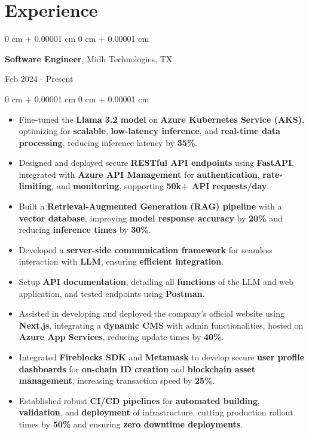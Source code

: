 \documentclass[10pt, letterpaper]{article}
\newenvironment{highlights}{
    \begin{itemize}[
        topsep=0.10 cm,
        parsep=0.10 cm,
        partopsep=0pt,
        itemsep=0pt,
        leftmargin=0 cm + 10pt
    ]
}{
    \end{itemize}
} %
\newenvironment{onecolentry}{
    \begin{adjustwidth}{
        0 cm + 0.00001 cm
    }{
        0 cm + 0.00001 cm
    }
}{
    \end{adjustwidth}
} %
\newenvironment{twocolentry}[2][]{
    \onecolentry
    \def\secondColumn{#2}
    \setcolumnwidth{\fill, 4.5 cm}
    \begin{paracol}{2}
}{
    \switchcolumn \raggedleft \secondColumn
    \end{paracol}
    \endonecolentry
} %
\begin{document}
\section{Experience}

\begin{twocolentry}{
		Feb 2024 - Present
	}
	\textbf{Software Engineer}, Midh Technologies, TX
\end{twocolentry}

\begin{onecolentry}
	\begin{highlights}
		\item Fine-tuned the \textbf{Llama 3.2 model} on \textbf{Azure Kubernetes Service (AKS)}, optimizing for \textbf{scalable}, \textbf{low-latency inference}, and \textbf{real-time data processing}, reducing inference latency by \textbf{35\%}.
		\item Designed and deployed secure \textbf{RESTful API endpoints} using \textbf{FastAPI}, integrated with \textbf{Azure API Management} for \textbf{authentication}, \textbf{rate-limiting}, and \textbf{monitoring}, supporting \textbf{50k+ API requests/day}.
		\item Built a \textbf{Retrieval-Augmented Generation (RAG) pipeline} with a \textbf{vector database}, improving \textbf{model response accuracy} by \textbf{20\%} and reducing \textbf{inference times} by \textbf{30\%}.
		\item Developed a \textbf{server-side communication framework} for seamless interaction with \textbf{LLM}, ensuring \textbf{efficient integration}.
		\item Setup \textbf{API documentation}, detailing all \textbf{functions} of the LLM and web application, and tested endpoints using \textbf{Postman}.
		\item Assisted in developing and deployed the company’s official website using \textbf{Next.js}, integrating a \textbf{dynamic CMS} with admin functionalities, hosted on \textbf{Azure App Services}, reducing update times by \textbf{40\%}.
		\item Integrated \textbf{Fireblocks SDK} and \textbf{Metamask} to develop secure \textbf{user profile dashboards} for \textbf{on-chain ID creation} and \textbf{blockchain asset management}, increasing transaction speed by \textbf{25\%}.
		\item Established robust \textbf{CI/CD pipelines} for \textbf{automated building}, \textbf{validation}, and \textbf{deployment} of infrastructure, cutting production rollout times by \textbf{50\%} and ensuring \textbf{zero downtime deployments}.

\end{highlights}
\end{onecolentry}
\end{document}

